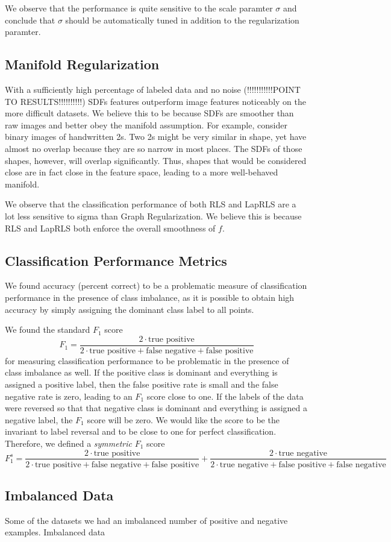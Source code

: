 \documentclass[anon,11pt]{9520} %
\begin{document}
We observe that the performance is quite sensitive to the scale paramter $\sigma$ and conclude that $\sigma$ should be automatically tuned in addition to the regularization paramter.

\subsection{Manifold Regularization} 

With a sufficiently high percentage of labeled data and no noise (!!!!!!!!!!!POINT TO RESULTS!!!!!!!!!!) SDFs features outperform image features noticeably on the more difficult datasets. We believe this to be because SDFs are smoother than raw images and better obey the manifold assumption. For example, consider binary images of handwritten 2s. Two 2s might be very similar in shape, yet have almost no overlap because they are so narrow in most places. The SDFs of those shapes, however, will overlap significantly. Thus, shapes that would be considered close are in fact close in the feature space, leading to a more well-behaved manifold.

We observe that the classification performance of both RLS and LapRLS are a lot less sensitive to sigma than Graph Regularization. We believe this is because RLS and LapRLS both enforce the overall smoothness of $f$.

\subsection{Classification Performance Metrics}
We found accuracy (percent correct) to be a problematic measure of classification performance in the presence of class imbalance, as it is possible to obtain high accuracy by simply assigning the dominant class label to all points.

We found the standard $F_1$ score \[F_1 = \frac{2 \cdot \text{true positive}}{2 \cdot \text{true positive} + \text{false negative} + \text{false positive}}\] for measuring classification performance to be problematic in the presence of class imbalance as well. If the positive class is dominant and everything is assigned a positive label, then the false positive rate is small and the false negative rate is zero, leading to an $F_1$ score close to one. If the labels of the data were reversed so that that negative class is dominant and everything is assigned a negative label, the $F_1$ score will be zero. We would like the score to be the invariant to label reversal and to be close to one for perfect classification. Therefore, we defined a {\em symmetric} $F_1$ score \[F_1^{s} = \frac{2 \cdot \text{true positive}}{2 \cdot \text{true positive} + \text{false negative} + \text{false positive}} + \frac{2 \cdot \text{true negative}}{2 \cdot \text{true negative} + \text{false positive} + \text{false negative}}\]

\subsection{Imbalanced Data}

Some of the datasets we had an imbalanced number of positive and negative examples. Imbalanced data


%
\end{document}
